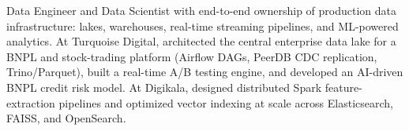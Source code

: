 \small{Data Engineer and Data Scientist with end-to-end ownership of production data infrastructure: lakes, warehouses, real-time streaming pipelines, and ML-powered analytics. At Turquoise Digital, architected the central enterprise data lake for a BNPL and stock-trading platform (Airflow DAGs, PeerDB CDC replication, Trino/Parquet), built a real-time A/B testing engine, and developed an AI-driven BNPL credit risk model. At Digikala, designed distributed Spark feature-extraction pipelines and optimized vector indexing at scale across Elasticsearch, FAISS, and OpenSearch.}\vspace{3pt}
